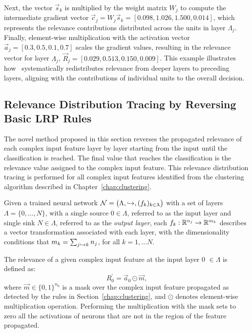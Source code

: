 Next, the vector \(\vec{s}_k\) is multiplied by the weight matrix \(W_j\) to compute the intermediate gradient vector \(\vec{c}_j = W_j \vec{s}_k = [0.098, 1.026, 1.500, 0.014]\), which represents the relevance contributions distributed across the units in layer \(\Lambda_j\). Finally, element-wise multiplication with the activation vector \(\vec{a}_j = [0.3, 0.5, 0.1, 0.7]\) scales the gradient values, resulting in the relevance vector for layer \(\Lambda_j\), \(\vec{R}_j = [0.029, 0.513, 0.150, 0.009]\). This example illustrates how \LRP\ systematically redistributes relevance from deeper layers to preceding layers, aligning with the contributions of individual units to the overall decision. 

\subsection{Relevance Distribution
Tracing by Reversing Basic LRP Rules}
\label{rev_LRP}
The novel method proposed in this section reverses the propagated relevance of each complex input feature layer by layer starting from the input until the classification is reached. The final value that reaches the classification is the relevance value assigned to the complex input feature. This relevance distribution tracing is performed for all complex input features identified from the clustering algorithm described in Chapter~\ref{chap:clustering}. 


Given a trained neural network $\mathcal{N}=\big(\Lambda,\hookrightarrow,(f_k)_{k\in \Lambda}\big)$ with a set of layers $\Lambda=\{0,\dots, N\}$, with a single source $0\in \Lambda$, referred to as the input layer and single sink $N\in \Lambda$, referred to as the \emph{output layer}, each $f_k:\mathbb{R}^{n_j}\to \mathbb{R}^{m_k}$ describes a vector transformation associated with each layer, with the dimensionality conditions that $m_k=\sum_{j\hookrightarrow k} n_j$, for all $k=1,\dots N$. 

The relevance of a given complex input feature at the input layer 0 $\in \Lambda$ is defined as:
\begin{equation*}
    R_0^\prime = \vec{a}_0 \odot \vec{m},
\end{equation*}
where $\vec{m}\in \{0,1\}^{n_0}$ is a mask over the complex input feature propagated as detected by the rules in Section~\ref{chap:clustering}, and $\odot$ denotes element-wise multiplication operation. Performing the multiplication with the mask sets to zero all the activations of neurons that are not in the region of the feature propagated.

